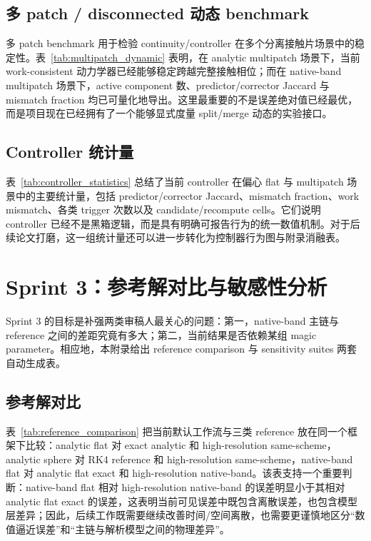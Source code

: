 \documentclass[11pt,a4paper]{ctexart}
\begin{document}


\subsection{多 patch / disconnected 动态 benchmark}
多 patch benchmark 用于检验 continuity/controller 在多个分离接触片场景中的稳定性。表~\ref{tab:multipatch_dynamic} 表明，在 analytic multipatch 场景下，当前 work-consistent 动力学器已经能够稳定跨越完整接触相位；而在 native-band multipatch 场景下，active component 数、predictor/corrector Jaccard 与 mismatch fraction 均已可量化地导出。这里最重要的不是误差绝对值已经最优，而是项目现在已经拥有了一个能够显式度量 split/merge 动态的实验接口。



\subsection{Controller 统计量}
表~\ref{tab:controller_statistics} 总结了当前 controller 在偏心 flat 与 multipatch 场景中的主要统计量，包括 predictor/corrector Jaccard、mismatch fraction、work mismatch、各类 trigger 次数以及 candidate/recompute cells。它们说明 controller 已经不是黑箱逻辑，而是具有明确可报告行为的统一数值机制。对于后续论文打磨，这一组统计量还可以进一步转化为控制器行为图与附录消融表。



\section{Sprint 3：参考解对比与敏感性分析}
Sprint 3 的目标是补强两类审稿人最关心的问题：第一，native-band 主链与 reference 之间的差距究竟有多大；第二，当前结果是否依赖某组 magic parameter。相应地，本附录给出 reference comparison 与 sensitivity suites 两套自动生成表。

\subsection{参考解对比}
表~\ref{tab:reference_comparison} 把当前默认工作流与三类 reference 放在同一个框架下比较：analytic flat 对 exact analytic 和 high-resolution same-scheme，analytic sphere 对 RK4 reference 和 high-resolution same-scheme，native-band flat 对 analytic flat exact 和 high-resolution native-band。该表支持一个重要判断：native-band flat 相对 high-resolution native-band 的误差明显小于其相对 analytic flat exact 的误差，这表明当前可见误差中既包含离散误差，也包含模型层差异；因此，后续工作既需要继续改善时间/空间离散，也需要更谨慎地区分“数值逼近误差”和“主链与解析模型之间的物理差异”。
\end{document}
